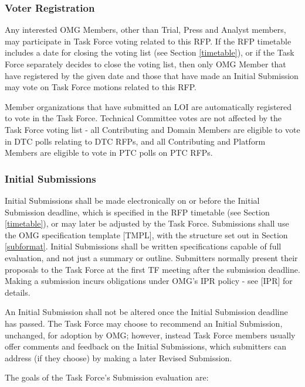 \subsubsection{Voter Registration}

Any interested OMG Members, other than Trial, Press and Analyst members, may participate in Task Force voting related to this RFP. If the RFP timetable includes a date for closing the voting list (see Section \ref{timetable}), or if the Task Force separately decides to close the voting list, then only OMG Member that have registered by the given date and those that have made an Initial Submission may vote on Task Force motions related to this RFP.

Member organizations that have submitted an LOI are automatically registered to vote in the Task Force. Technical Committee votes are not affected by the Task Force voting list - all Contributing and Domain Members are eligible to vote in DTC polls relating to DTC RFPs, and all Contributing and Platform Members are eligible to vote in PTC polls on PTC RFPs.



\subsubsection{Initial Submissions}

Initial Submissions shall be made electronically on or before the Initial Submission deadline, which is specified in the RFP timetable (see Section \ref{timetable}), or may later be adjusted by the Task Force. Submissions shall use the OMG specification template [TMPL], with the structure set out in Section \ref{subformat}. Initial Submissions shall be written specifications capable of full evaluation, and not just a summary or outline. Submitters normally present their proposals to the Task Force at the first TF meeting after the submission deadline. Making a submission incurs obligations under OMG's IPR policy - see [IPR] for details.

An Initial Submission shall not be altered once the Initial Submission deadline has passed. The Task Force may choose to recommend an Initial Submission, unchanged, for adoption by OMG; however, instead Task Force members usually offer comments and feedback on the Initial Submissions, which submitters can address (if they choose) by making a later Revised Submission.

The goals of the Task Force's Submission evaluation are:

